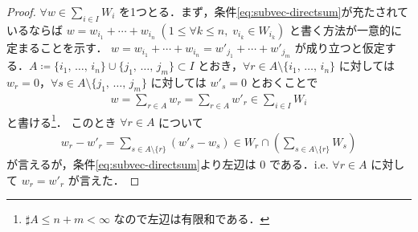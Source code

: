 \documentclass[rep_main]{subfiles}
\begin{document}
\begin{proof}
    $\forall w \in \sum_{i \in I} W_i$ を1つとる．まず，条件\eqref{eq:subvec-directsum}が充たされているならば $w = w_{i_1} + \cdots + w_{i_n}\; (1 \le \forall k \le n,\; v_{i_k} \in W_{i_k})$ と書く方法が一意的に定まることを示す．
    $w = w_{i_1} + \cdots + w_{i_n} = w'_{j_1} + \cdots + w'_{j_m}$ が成り立つと仮定する．$A \coloneqq \{i_1,\, \dots,\, i_n\} \cup \{j_1,\, \dots,\, j_m\} \subset I$ とおき，$\forall r \in A \setminus \{i_1,\, \dots,\, i_n\}$ に対しては $w_{r} = 0$，$\forall s \in A \setminus \{j_1,\, \dots,\, j_m\}$ に対しては $w'_s = 0$ とおくことで
    \begin{align}
        w = \sum_{r \in A} w_r = \sum_{r \in A} w'_r \in \sum_{i \in I} W_i
    \end{align}
    と書ける\footnote{$\sharp A \le n + m < \infty$ なので左辺は有限和である．}．
    このとき $\forall r \in A$ について
    \begin{align}
        w_r - w'_r = \sum_{s \in A \setminus \{r\}} (w'_s - w_s) \in W_r \cap \left(\sum_{s \in A \setminus \{r\}} W_s\right)
    \end{align}
    が言えるが，条件\eqref{eq:subvec-directsum}より左辺は $0$ である．i.e. $\forall r \in A$ に対して $w_r = w'_r$ が言えた．


\end{proof}
\end{document}
